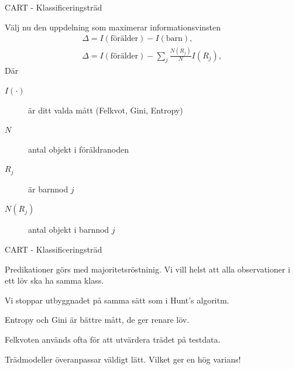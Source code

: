 \documentclass[10pt,english]{beamer}
\begin{document}
\begin{frame}{CART - Klassificeringsträd}

    Välj nu den uppdelning som maximerar informationsvinsten
    \begin{align*}
        \Delta = I(\text{förälder}) - I(\text{barn}), \\
        \Delta = I(\text{förälder}) - \sum_{j} \frac{N(R_j)}{N} I(R_j),
    \end{align*}
    Där
    \begin{description}
        \item[$I(\cdot)$] är ditt valda mått (Felkvot, Gini, Entropy)
        \item[$N$] antal objekt i föräldranoden
        \item[$R_j$] är barnnod $j$
        \item[$N(R_j)$] antal objekt i barnnod $j$    
    \end{description}
    
\end{frame}

\begin{frame}{CART - Klassificeringsträd}

    Predikationer görs med majoritetsröstninig. Vi vill helst att alla observationer i ett löv ska ha samma klass.

    Vi stoppar utbyggnadet på samma sätt som i Hunt's algoritm.

    Entropy och Gini är bättre mått, de ger renare löv.

    Felkvoten används ofta för att utvärdera trädet på testdata.

    Trädmodeller överanpassar väldigt lätt. Vilket ger en hög varians!
    
\end{frame}
\end{document}
